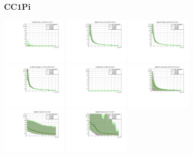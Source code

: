\subsubsection{CC1Pi}

\begin{center}

  \includegraphics[width=0.245\textwidth]{plots/Elost_profiles/Proton_KE_FHC_CC1Pi.pdf}
  \includegraphics[width=0.245\textwidth]{plots/Elost_profiles/PiPlus_KE_FHC_CC1Pi.pdf}
  \includegraphics[width=0.245\textwidth]{plots/Elost_profiles/PiMinus_KE_FHC_CC1Pi.pdf}
  \includegraphics[width=0.245\textwidth]{plots/Elost_profiles/Charged_Pi_KE_FHC_CC1Pi.pdf}
  \includegraphics[width=0.245\textwidth]{plots/Elost_profiles/Pi0_KE_FHC_CC1Pi.pdf}
  \includegraphics[width=0.245\textwidth]{plots/Elost_profiles/Proton+Pion_KE_FHC_CC1Pi.pdf}
  \includegraphics[width=0.245\textwidth]{plots/Elost_profiles/Total_FHC_CC1Pi.pdf}
  \includegraphics[width=0.245\textwidth]{plots/Elost_profiles/Hadrons_FHC_CC1Pi.pdf}
  
\end{center}

